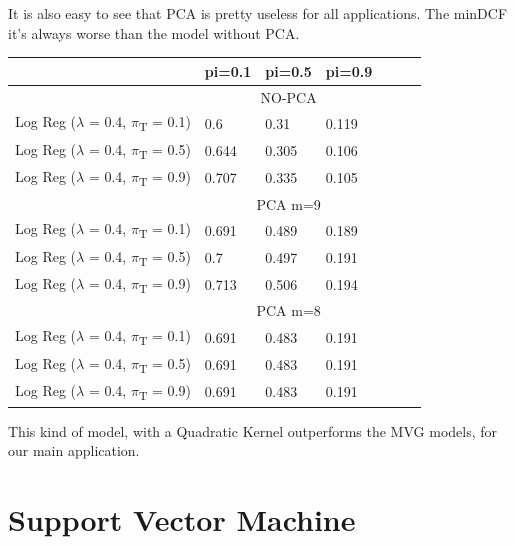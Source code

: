 \documentclass[english]{report}
\begin{document}
It is also easy to see that PCA is pretty useless for all applications.
The minDCF it's always worse than the model without PCA.

\begin{table}[H]
    \centering
    
    \begin{tabular}{lllllll}
        \hline
                                & pi=0.1 & pi=0.5 & pi=0.9 \\ \hline
                                & \multicolumn{3}{c}{NO-PCA}  \\
    Log Reg ($\lambda$ = 0.4, $\pi$\textsubscript{T} = 0.1)   & 0.6      & 0.31      & 0.119      \\
    Log Reg ($\lambda$ = 0.4, $\pi$\textsubscript{T} = 0.5)   & 0.644      & 0.305      & 0.106       \\
    Log Reg ($\lambda$ = 0.4, $\pi$\textsubscript{T} = 0.9)   & 0.707      & 0.335      & 0.105      \\
                                & \multicolumn{3}{c}{PCA m=9}  \\ \hline
    Log Reg ($\lambda$ = 0.4, $\pi$\textsubscript{T} = 0.1)   & 0.691      & 0.489       & 0.189       \\
    Log Reg ($\lambda$ = 0.4, $\pi$\textsubscript{T} = 0.5)   & 0.7      & 0.497      & 0.191      \\
    Log Reg ($\lambda$ = 0.4, $\pi$\textsubscript{T} = 0.9)   & 0.713      & 0.506      & 0.194      \\
                                & \multicolumn{3}{c}{PCA m=8}  \\ \hline
    Log Reg ($\lambda$ = 0.4, $\pi$\textsubscript{T} = 0.1)   & 0.691       & 0.483       & 0.191       \\
    Log Reg ($\lambda$ = 0.4, $\pi$\textsubscript{T} = 0.5)   & 0.691      & 0.483      & 0.191      \\
    Log Reg ($\lambda$ = 0.4, $\pi$\textsubscript{T} = 0.9)   & 0.691      & 0.483      & 0.191      \\
    \hline
    \end{tabular}
\end{table}

This kind of model, with a Quadratic Kernel outperforms the MVG models, for our main application.

\clearpage

\section{Support Vector Machine}
\end{document}
